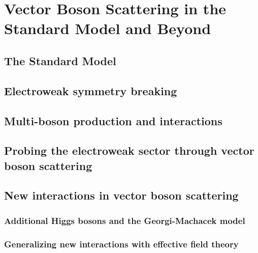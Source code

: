 \chapter{Vector Boson Scattering in the Standard Model and Beyond}

\section{The Standard Model}
\section{Electroweak symmetry breaking}
\section{Multi-boson production and interactions}
\section{Probing the electroweak sector through vector boson scattering}
\section{New interactions in vector boson scattering}
\subsection{Additional Higgs bosons and the Georgi-Machacek model}
\subsection{Generalizing new interactions with effective field theory}
